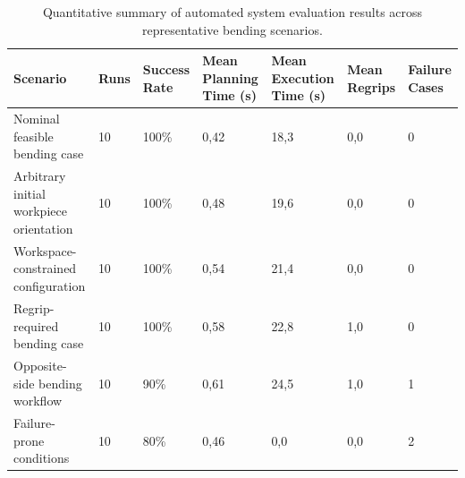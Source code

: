 \begin{table}[htbp]
\centering
\normalsize
\setlength{\tabcolsep}{4pt}
\begin{tabularx}{\textwidth}{
L{3.7cm}
C{1.0cm}
C{1.6cm}
C{2.0cm}
C{2.2cm}
C{1.5cm}
C{1.5cm}
}
\toprule
\textbf{Scenario} &
\textbf{Runs} &
\textbf{Success Rate} &
\textbf{Mean Planning Time (s)} &
\textbf{Mean Execution Time (s)} &
\textbf{Mean Regrips} &
\textbf{Failure Cases} \\
\midrule

Nominal feasible bending case &
10 &
100\% &
0,42 &
18,3 &
0,0 &
0 \\

Arbitrary initial workpiece orientation &
10 &
100\% &
0,48 &
19,6 &
0,0 &
0 \\

Workspace-constrained configuration &
10 &
100\% &
0,54 &
21,4 &
0,0 &
0 \\

Regrip-required bending case &
10 &
100\% &
0,58 &
22,8 &
1,0 &
0 \\

Opposite-side bending workflow &
10 &
90\% &
0,61 &
24,5 &
1,0 &
1 \\

Failure-prone conditions &
10 &
80\% &
0,46 &
0,0 &
0,0 &
2 \\

\bottomrule
\end{tabularx}
\caption{Quantitative summary of automated system evaluation results across representative bending scenarios.}
\label{tab:evaluation_summary}
\end{table}

\FloatBarrier
